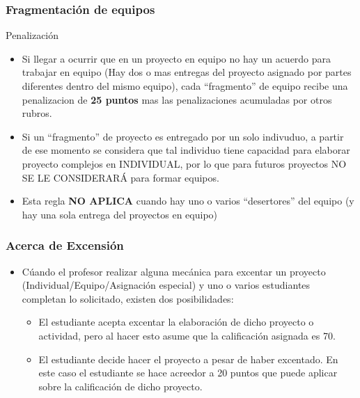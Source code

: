 \begin{frame}
\frametitle{Fragmentaci\'on de equipos}
\begin{block}{Penalizaci\'on}
\begin{itemize}
\item Si llegar a ocurrir que en un proyecto en equipo no hay un acuerdo para trabajar en equipo (Hay dos o mas entregas del proyecto asignado por partes diferentes dentro del mismo equipo), cada ``fragmento'' de equipo recibe una penalizacion de \textbf{25 puntos} mas las penalizaciones acumuladas por otros rubros. 
\item Si un ``fragmento'' de proyecto es entregado por un solo indivuduo, a partir de ese momento se considera que tal individuo tiene capacidad para elaborar proyecto complejos en INDIVIDUAL, por lo que para futuros proyectos NO SE LE CONSIDERARÁ para formar equipos.
\item Esta regla \textbf{NO APLICA} cuando hay uno o varios ``desertores'' del equipo (y hay una sola entrega del proyectos en equipo)
\end{itemize}
\end{block}
\end{frame}



\begin{frame}
\frametitle{Acerca de Excensión}
\begin{itemize}
\item Cúando el profesor realizar alguna mecánica para excentar un proyecto (Individual/Equipo/Asignación especial) y uno o varios estudiantes completan lo solicitado, existen dos posibilidades:
\begin{itemize}
\item El estudiante acepta excentar la elaboración de dicho proyecto o actividad, pero al hacer esto asume que la calificación asignada es 70.
\item El estudiante decide hacer el proyecto a pesar de haber excentado. En este caso el estudiante se hace acreedor a 20 puntos que puede aplicar sobre la calificación de dicho proyecto. 
\end{itemize}
\end{itemize}


\end{frame}



